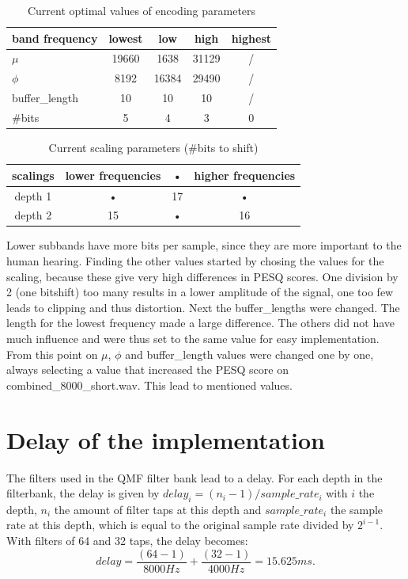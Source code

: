\documentclass[a4paper]{article}
\begin{document}
\begin{table}[h]
\centering
\begin{tabular}{l|cccc} 
band frequency & lowest & low & high & highest \\ 
\hline 
$\mu$ & 19660 & 1638 & 31129 & / \\  
$\phi$ & 8192 & 16384 & 29490 & / \\  
buffer\_length & 10 & 10 & 10 & / \\  
\#bits & 5 & 4 & 3 & 0 \\ 
\hline 
\end{tabular}
\caption{Current optimal values of encoding parameters}
\label{tab:parametervalues}
\end{table}
\begin{table}[h]
\centering
\begin{tabular}{c|ccc}
scalings & lower frequencies & • &  higher frequencies \\ 
\hline 
depth 1 &  • & 17 & •  \\ 
depth 2 &  15 & • & 16  \\ 
\hline 
\end{tabular} 
\caption{Current scaling parameters (\#bits to shift)}
\label{tab:scalingparameters}
\end{table}
Lower subbands have more bits per sample, since they are more important to the human hearing. Finding the other values started by chosing the values for the scaling, because these give very high differences in PESQ scores. One division by 2 (one bitshift) too many results in a lower amplitude of the signal, one too few leads to clipping and thus distortion. Next the buffer\_lengths were changed. The length for the lowest frequency made a large difference. The others did not have much influence and were thus set to the same value for easy implementation. From this point on $\mu$, $\phi$ and buffer\_length values were changed one by one, always selecting a value that increased the PESQ score on combined\_8000\_short.wav. This lead to mentioned values.

\section{Delay of the implementation}
The filters used in the QMF filter bank lead to a delay. For each depth in the filterbank, the delay is given by $delay_i = (n_i-1) / sample\_rate_i$ with $i$ the depth, $n_i$ the amount of filter taps at this depth and $sample\_rate_i$ the sample rate at this depth, which is equal to the original sample rate divided by $2^{i-1}$. With filters of 64 and 32 taps, the delay becomes:
\begin{equation*}
delay = \frac{(64-1)}{8000 Hz} + \frac{(32-1)}{4000 Hz} = 15.625 ms.
\end{equation*}
\end{document}
